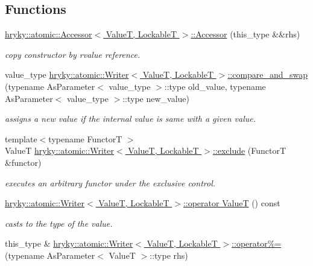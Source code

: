 \subsection*{Functions}
\begin{DoxyCompactItemize}
\item 
\hypertarget{group__atomic__operation_ga3af8cf4027ed397ac63bd9cacb21b914}{\hyperlink{group__atomic__operation_ga3af8cf4027ed397ac63bd9cacb21b914}{hryky\-::atomic\-::\-Accessor$<$ Value\-T, Lockable\-T $>$\-::\-Accessor} (this\-\_\-type \&\&rhs)}\label{group__atomic__operation_ga3af8cf4027ed397ac63bd9cacb21b914}

\begin{DoxyCompactList}\small\item\em copy constructor by rvalue reference. \end{DoxyCompactList}\item 
value\-\_\-type \hyperlink{group__atomic__operation_ga39b7ebbb7b13b8b1a0b05a4e04f4176f}{hryky\-::atomic\-::\-Writer$<$ Value\-T, Lockable\-T $>$\-::compare\-\_\-and\-\_\-swap} (typename As\-Parameter$<$ value\-\_\-type $>$\-::type old\-\_\-value, typename As\-Parameter$<$ value\-\_\-type $>$\-::type new\-\_\-value)
\begin{DoxyCompactList}\small\item\em assigns a new value if the internal value is same with a given value. \end{DoxyCompactList}\item 
{\footnotesize template$<$typename Functor\-T $>$ }\\Value\-T \hyperlink{group__atomic__operation_gae595f32af60a397c190c0d02fd5da565}{hryky\-::atomic\-::\-Writer$<$ Value\-T, Lockable\-T $>$\-::exclude} (Functor\-T \&functor)
\begin{DoxyCompactList}\small\item\em executes an arbitrary functor under the exclusive control. \end{DoxyCompactList}\item 
\hypertarget{group__atomic__operation_ga0d1ed1c369001d0f8bb4cdcacc0ea38b}{\hyperlink{group__atomic__operation_ga0d1ed1c369001d0f8bb4cdcacc0ea38b}{hryky\-::atomic\-::\-Writer$<$ Value\-T, Lockable\-T $>$\-::operator Value\-T} () const }\label{group__atomic__operation_ga0d1ed1c369001d0f8bb4cdcacc0ea38b}

\begin{DoxyCompactList}\small\item\em casts to the type of the value. \end{DoxyCompactList}\item 
\hypertarget{group__atomic__operation_ga4dcb98887412fd19c46efb2478f87277}{this\-\_\-type \& \hyperlink{group__atomic__operation_ga4dcb98887412fd19c46efb2478f87277}{hryky\-::atomic\-::\-Writer$<$ Value\-T, Lockable\-T $>$\-::operator\%=} (typename As\-Parameter$<$ Value\-T $>$\-::type rhs)}\label{group__atomic__operation_ga4dcb98887412fd19c46efb2478f87277}


\end{DoxyCompactItemize}
